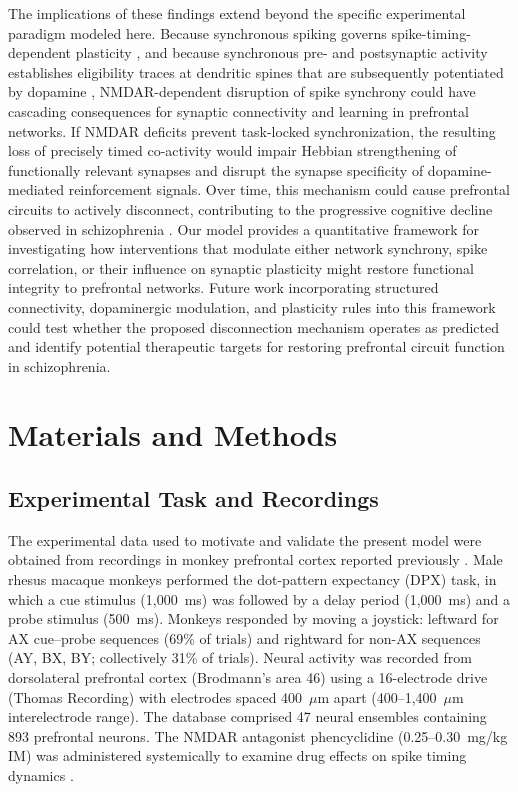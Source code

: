 \documentclass[10pt]{article}
\begin{document}
The implications of these findings extend beyond the specific experimental paradigm modeled here. Because synchronous spiking governs spike-timing-dependent plasticity \citep{dan2004spike}, and because synchronous pre- and postsynaptic activity establishes eligibility traces at dendritic spines that are subsequently potentiated by dopamine \citep{he2015eligibility, yagishita2014critical}, NMDAR-dependent disruption of spike synchrony could have cascading consequences for synaptic connectivity and learning in prefrontal networks. If NMDAR deficits prevent task-locked synchronization, the resulting loss of precisely timed co-activity would impair Hebbian strengthening of functionally relevant synapses and disrupt the synapse specificity of dopamine-mediated reinforcement signals. Over time, this mechanism could cause prefrontal circuits to actively disconnect, contributing to the progressive cognitive decline observed in schizophrenia \citep{zick2018blocking, zick2021disparate}. Our model provides a quantitative framework for investigating how interventions that modulate either network synchrony, spike correlation, or their influence on synaptic plasticity might restore functional integrity to prefrontal networks. Future work incorporating structured connectivity, dopaminergic modulation, and plasticity rules into this framework could test whether the proposed disconnection mechanism operates as predicted and identify potential therapeutic targets for restoring prefrontal circuit function in schizophrenia.

\section{Materials and Methods}

\subsection{Experimental Task and Recordings}

The experimental data used to motivate and validate the present model were obtained from recordings in monkey prefrontal cortex reported previously \citep{zick2018blocking}. Male rhesus macaque monkeys performed the dot-pattern expectancy (DPX) task, in which a cue stimulus (1,000~ms) was followed by a delay period (1,000~ms) and a probe stimulus (500~ms). Monkeys responded by moving a joystick: leftward for AX cue--probe sequences (69\% of trials) and rightward for non-AX sequences (AY, BX, BY; collectively 31\% of trials). Neural activity was recorded from dorsolateral prefrontal cortex (Brodmann's area 46) using a 16-electrode drive (Thomas Recording) with electrodes spaced 400~$\mu$m apart (400--1,400~$\mu$m interelectrode range). The database comprised 47 neural ensembles containing 893 prefrontal neurons. The NMDAR antagonist phencyclidine (0.25--0.30~mg/kg IM) was administered systemically to examine drug effects on spike timing dynamics \citep{zick2018blocking}.
\end{document}
